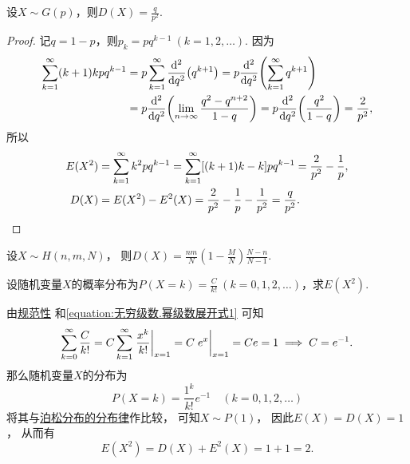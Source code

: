 \begin{theorem}\label{theorem:随机变量的数字特征.几何分布的方差}
设\(X \sim G(p)\)，则\(D(X) = \frac{q}{p^2}\).
\begin{proof}
记\(q = 1-p\)，则\(p_k = pq^{k-1}\ (k=1,2,\dotsc)\).
因为\begin{align*}
	\sum_{k=1}^\infty (k+1)kpq^{k-1}
	&= p \sum_{k=1}^\infty \dv[2]{q}(q^{k+1})
	= p \dv[2]{q}(\sum_{k=1}^\infty q^{k+1}) \\
	&= p \dv[2]{q}(\lim_{n\to\infty} \frac{q^2-q^{n+2}}{1-q})
	= p \dv[2]{q}(\frac{q^2}{1-q})
	= \frac{2}{p^2}, \\
\end{align*}
所以\begin{align*}
	E(X^2) &= \sum_{k=1}^\infty k^2 pq^{k-1}
	= \sum_{k=1}^\infty [(k+1)k-k] pq^{k-1}
	= \frac{2}{p^2} - \frac{1}{p}, \\
	D(X) &= E(X^2) - E^2(X)
	= \frac{2}{p^2} - \frac{1}{p} - \frac{1}{p^2}
	= \frac{q}{p^2}.
	\qedhere
\end{align*}
\end{proof}
\end{theorem}

\begin{proposition}\label{theorem:随机变量的数字特征.超几何分布的方差}
设\(X \sim H(n,m,N)\)，
则\(D(X) = \frac{n m}{N} \left( 1 - \frac{M}{N} \right) \frac{N - n}{N - 1}\).
\end{proposition}

\begin{example}
设随机变量\(X\)的概率分布为\(P(X=k) = \frac{C}{k!}\ (k=0,1,2,\dotsc)\)，求\(E(X^2)\).
\begin{solution}
由\hyperref[theorem:随机变量及其分布.离散型随机变量的密度函数的性质]{规范性}%
和\cref{equation:无穷级数.幂级数展开式1} 可知\[
	\sum_{k=0}^\infty \frac{C}{k!}
	= C \sum_{k=1}^\infty \eval{\frac{x^k}{k!}}_{x=1}
	= C \eval{e^x}_{x=1}
	= C e = 1
	\implies
	C = e^{-1}.
\]
那么随机变量\(X\)的分布为\[
	P(X=k) = \frac{1^k}{k!} e^{-1} \quad(k=0,1,2,\dotsc)
\]
将其与\hyperref[equation:随机变量及其分布.泊松分布的分布律]{泊松分布的分布律}作比较，
可知\(X \sim P(1)\)，
因此\(E(X) = D(X) = 1\)，
从而有\[
	E(X^2) = D(X) + E^2(X) = 1 + 1 = 2.
\]
\end{solution}
\end{example}

